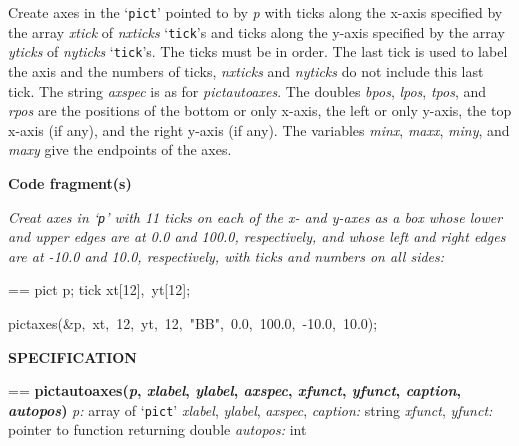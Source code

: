 \documentclass{book}
\makeatletter
\newcommand\Texinfocommandstyletextvar[1]{{\normalfont{}\textsl{#1}}}%
\newenvironment{Texinfopreformatted}{%
  \par\GNUTobeylines\obeyspaces\frenchspacing\parskip=\z@\parindent=\z@}{}
{\catcode`\^^M=13 \gdef\GNUTobeylines{\catcode`\^^M=13 \def^^M{\null\par}}}
\newenvironment{Texinfoindented}{\begin{list}{}{}\item\relax}{\end{list}}
\renewcommand{\_}{\Texinfounderscore\discretionary{}{}{}}
\makeatother
\begin{document}
Create axes in the `\texttt{pict}' pointed to by \Texinfocommandstyletextvar{p}
with ticks along the x-axis specified by the array \Texinfocommandstyletextvar{xtick} of
\Texinfocommandstyletextvar{nxticks} `\texttt{tick}'s
and ticks along the y-axis specified by the array \Texinfocommandstyletextvar{yticks} of
\Texinfocommandstyletextvar{nyticks} `\texttt{tick}'s.
The ticks must be in order.
The last tick is used to label the axis and the numbers of ticks,
\Texinfocommandstyletextvar{nxticks} and \Texinfocommandstyletextvar{nyticks} do not include this last tick.
The string \Texinfocommandstyletextvar{axspec} is as for \Texinfocommandstyletextvar{pict\_autoaxes}.
The doubles \Texinfocommandstyletextvar{bpos}, \Texinfocommandstyletextvar{lpos}, \Texinfocommandstyletextvar{tpos}, and \Texinfocommandstyletextvar{rpos}
are the positions of the bottom or only x-axis, the left or only y-axis,
the top x-axis (if any), and the right y-axis (if any).
The variables \Texinfocommandstyletextvar{minx}, \Texinfocommandstyletextvar{maxx}, \Texinfocommandstyletextvar{miny}, and \Texinfocommandstyletextvar{maxy}
give the endpoints of the axes.

\noindent{}\textbf{Code fragment(s)}

\emph{Creat axes in `\texttt{p}' with 11 ticks on each of the
x- and y-axes as a box whose lower and upper edges are at
0.0 and 100.0, respectively, and whose left and right edges are at
-10.0 and 10.0, respectively, with ticks and numbers on all sides:}
\begin{Texinfoindented}
\begin{Texinfopreformatted}%
\ttfamily pict p;
tick xt[12],\ yt[12];

pict\_axes(\&p,\ xt,\ 12,\ yt,\ 12,\ "BB",\ 0.0,\ 100.0,\ -10.0,\ 10.0);
\end{Texinfopreformatted}
\end{Texinfoindented}

\noindent{}\textbf{SPECIFICATION}
\begin{Texinfoindented}
\begin{Texinfopreformatted}%
\textbf{pict\_autoaxes(\Texinfocommandstyletextvar{p}, \Texinfocommandstyletextvar{xlabel}, \Texinfocommandstyletextvar{ylabel}, \Texinfocommandstyletextvar{axspec}, \Texinfocommandstyletextvar{xfunct}, \Texinfocommandstyletextvar{yfunct}, \Texinfocommandstyletextvar{caption}, \Texinfocommandstyletextvar{autopos})}
\Texinfocommandstyletextvar{p:} array of `\texttt{pict}'
\Texinfocommandstyletextvar{xlabel}, \Texinfocommandstyletextvar{ylabel}, \Texinfocommandstyletextvar{axspec}, \Texinfocommandstyletextvar{caption:} string
\Texinfocommandstyletextvar{xfunct}, \Texinfocommandstyletextvar{yfunct:} pointer to function returning double
\Texinfocommandstyletextvar{autopos:} int
\end{Texinfopreformatted}
\end{Texinfoindented}
%
%
%
%
%
\end{document}
